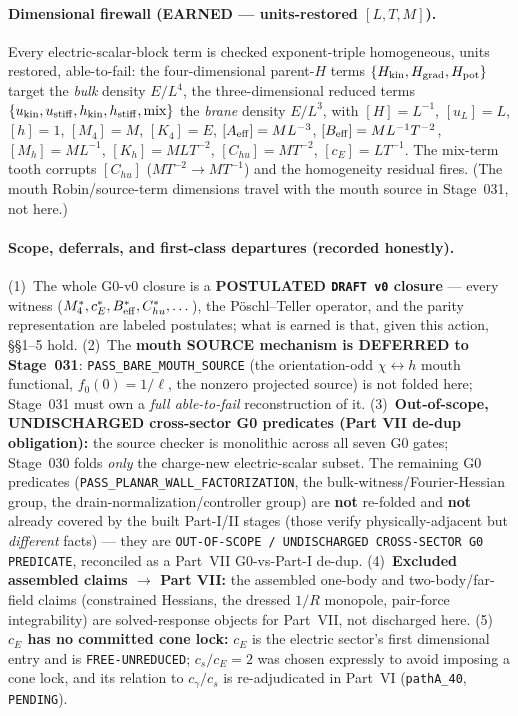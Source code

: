 \paragraph{Dimensional firewall (EARNED --- units-restored \([L,T,M]\)).}
Every electric-scalar-block term is checked exponent-triple homogeneous, units
restored, able-to-fail: the four-dimensional parent-\(H\) terms
\(\{H_{\rm kin},H_{\rm grad},H_{\rm pot}\}\) target the \emph{bulk} density
\(E/L^4\), the three-dimensional reduced terms
\(\{u_{\rm kin},u_{\rm stiff},h_{\rm kin},h_{\rm stiff},\mathrm{mix}\}\) the
\emph{brane} density \(E/L^3\), with \([H]=L^{-1}\), \([u_L]=L\), \([h]=1\),
\([M_4]=M\), \([K_4]=E\), \([A_{\rm eff}]=ML^{-3}\), \([B_{\rm eff}]=ML^{-1}T^{-2}\),
\([M_h]=ML^{-1}\), \([K_h]=MLT^{-2}\), \([C_{hu}]=MT^{-2}\), \([c_E]=LT^{-1}\).
The \(\mathrm{mix}\)-term tooth corrupts \([C_{hu}]\) (\(MT^{-2}\to MT^{-1}\)) and
the homogeneity residual fires. (The mouth Robin/source-term dimensions travel
with the mouth source in Stage~031, not here.)

\paragraph{Scope, deferrals, and first-class departures (recorded honestly).}
(1)~The whole G0-v0 closure is a \textbf{POSTULATED \texttt{DRAFT v0} closure} ---
every witness (\(M_4^*,c_E^*,B_{\rm eff}^*,C_{hu}^*,\dots\)), the P\"oschl--Teller
operator, and the parity representation are labeled postulates; what is earned is
that, given this action, \S\S1--5 hold. (2)~The \textbf{mouth SOURCE mechanism is
DEFERRED to Stage~031}: \texttt{PASS\_BARE\_MOUTH\_SOURCE} (the orientation-odd
\(\chi\leftrightarrow h\) mouth functional, \(f_0(0)=1/\ell\), the nonzero
projected source) is not folded here; Stage~031 must own a \emph{full
able-to-fail} reconstruction of it. (3)~\textbf{Out-of-scope, UNDISCHARGED
cross-sector G0 predicates (Part VII de-dup obligation):} the source checker is
monolithic across all seven G0 gates; Stage~030 folds \emph{only} the charge-new
electric-scalar subset. The remaining G0 predicates
(\texttt{PASS\_PLANAR\_WALL\_FACTORIZATION}, the bulk-witness/Fourier-Hessian
group, the drain-normalization/controller group) are \textbf{not} re-folded and
\textbf{not} already covered by the built Part-I/II stages (those verify
physically-adjacent but \emph{different} facts) --- they are
\texttt{OUT-OF-SCOPE / UNDISCHARGED CROSS-SECTOR G0 PREDICATE}, reconciled as a
Part~VII G0-vs-Part-I de-dup. (4)~\textbf{Excluded assembled claims \(\to\) Part
VII:} the assembled one-body and two-body/far-field claims (constrained
Hessians, the dressed \(1/R\) monopole, pair-force integrability) are solved-response
objects for Part~VII, not discharged here. (5)~\textbf{\(c_E\) has no committed
cone lock:} \(c_E\) is the electric sector's first dimensional entry and is
\texttt{FREE-UNREDUCED}; \(c_s/c_E=2\) was chosen expressly to avoid imposing a
cone lock, and its relation to \(c_\gamma/c_s\) is re-adjudicated in Part~VI
(\texttt{pathA\_40}, \texttt{PENDING}).

